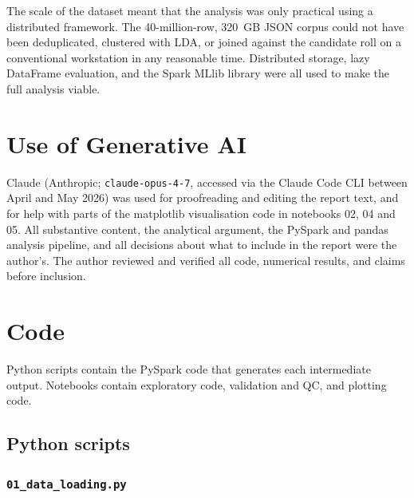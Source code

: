 \documentclass[11pt,a4paper]{article}
\begin{document}
The scale of the dataset meant that the analysis was only practical using a distributed framework. The 40-million-row, 320~GB JSON corpus could not have been deduplicated, clustered with LDA, or joined against the candidate roll on a conventional workstation in any reasonable time. Distributed storage, lazy DataFrame evaluation, and the Spark MLlib library were all used to make the full analysis viable.



\appendix
\section{Use of Generative AI}
Claude (Anthropic; \texttt{claude-opus-4-7}, accessed via the Claude Code CLI between April and May 2026) was used for proofreading and editing the report text, and for help with parts of the matplotlib visualisation code in notebooks 02, 04 and 05. All substantive content, the analytical argument, the PySpark and pandas analysis pipeline, and all decisions about what to include in the report were the author's. The author reviewed and verified all code, numerical results, and claims before inclusion.

\section{Code}
Python scripts contain the PySpark code that generates each intermediate output. Notebooks contain exploratory code, validation and QC, and plotting code.

\subsection*{Python scripts}

\subsubsection*{\texttt{01\_data\_loading.py}}

\end{document}
